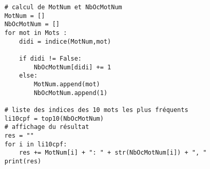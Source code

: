 \begin{enumerate}
\begin{verbatim}
    # calcul de MotNum et NbOcMotNum
    MotNum = []
    NbOcMotNum = []
    for mot in Mots :
        didi = indice(MotNum,mot)

        if didi != False:
            NbOcMotNum[didi] += 1
        else:
            MotNum.append(mot)
            NbOcMotNum.append(1)
            
    # liste des indices des 10 mots les plus fréquents
    li10cpf = top10(NbOcMotNum)
    # affichage du résultat
    res = ""
    for i in li10cpf:
        res += MotNum[i] + ": " + str(NbOcMotNum[i]) + ", "
    print(res)
\end{verbatim}

\end{enumerate}
